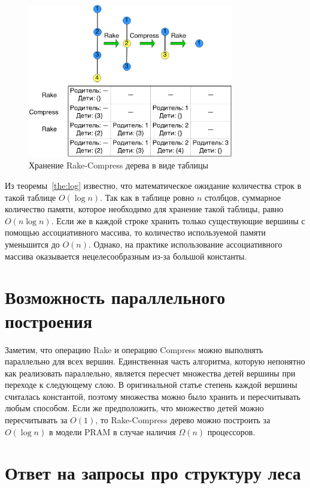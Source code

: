 \begin{figure}[h]
\centering
\includegraphics[width=0.8\textwidth]{pics/example.png}
\caption{Хранение Rake-Compress дерева в виде таблицы}
\label{pic:table}
\end{figure}


Из теоремы~\ref{the:log} известно, что математическое ожидание количества строк в такой таблице $O(\log n)$.  
Так как в таблице ровно $n$ столбцов, суммарное количество памяти, которое необходимо для хранение такой таблицы, равно $O(n \log n)$.
Если же в каждой строке хранить только существующие вершины с помощью ассоциативного массива, то количество используемой памяти уменьшится до $O(n)$. 
Однако, на практике использование ассоциативного массива оказывается нецелесообразным из-за большой константы.

\FloatBarrier
\section{Возможность параллельного построения}

Заметим, что операцию Rake и операцию Compress можно выполнять параллельно для всех вершин. 
Единственная часть алгоритма, которую непонятно как реализовать параллельно, является пересчет множества детей вершины при переходе к следующему слою. 
В оригинальной статье степень каждой вершины считалась константой, поэтому множества можно было хранить и пересчитывать любым способом. Если же предположить, 
что множество детей можно пересчитывать за $O(1)$, то Rake-Compress дерево можно построить за $O(\log n)$ в модели PRAM в случае наличия $\Omega(n)$ процессоров.

\FloatBarrier
\section{Ответ на запросы про структуру леса}

